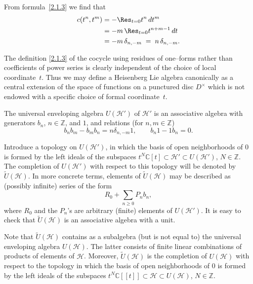 \documentclass[12pt]{article}
\begin{document}
From formula~\eqref{2.1.3} we find that
\[
    \begin{aligned}
        c(t^n, t^m)
         & = -\Res_{t=0} t^n\,dt^m        \\
         & = -m\,\Res_{t=0} t^{n+m-1}\,dt \\
         & = -m\,\delta_{n,-m}
        \;=\; n\,\delta_{n,-m}.
    \end{aligned}
\]

The definition \eqref{2.1.3} of the cocycle using residues of one–forms rather than coefficients of power series is clearly independent of the choice of local coordinate~$t$.
Thus we may define a Heisenberg Lie algebra canonically as a central extension of the space of functions on a punctured disc $D^\times$ which is not endowed with a specific choice of formal coordinate~$t$.


The universal enveloping algebra $U(\mathcal{H}')$ of $\mathcal{H}'$ is an associative algebra with generators $b_n$, $n\in\mathbb{Z}$, and $1$, and relations (for $n,m\in\mathbb{Z}$)
\[
    b_n b_m - b_m b_n = n \delta_{n,-m} 1,
    \qquad
    b_n 1 - 1 b_n = 0.
\]

Introduce a topology on $U(\mathcal{H}')$, in which the basis of open neighborhoods of $0$ is formed by the left ideals of the subspaces
$t^N\mathbb{C}[t] \subset \mathcal{H}' \subset U(\mathcal{H}')$, $N\in\mathbb{Z}$.
The completion of $U(\mathcal{H}')$ with respect to this topology will be denoted by $\widetilde{U}(\mathcal{H})$.
In more concrete terms, elements of $\widetilde{U}(\mathcal{H})$ may be described as (possibly infinite) series of the form
\[
    R_0 + \sum_{n\ge 0} P_n b_n,
\]
where $R_0$ and the $P_n$’s are arbitrary (finite) elements of $U(\mathcal{H}')$.
It is easy to check that $\widetilde{U}(\mathcal{H})$ is an associative algebra with a unit.

Note that $\widetilde{U}(\mathcal{H})$ contains as a subalgebra (but is not equal to) the universal enveloping algebra $U(\mathcal{H})$.
The latter consists of finite linear combinations of products of elements of $\mathcal{H}$.
Moreover, $\widetilde{U}(\mathcal{H})$ is the completion of $U(\mathcal{H})$ with respect to the topology in which the basis of open neighborhoods of $0$ is formed by the left ideals of the subspaces
$t^N\mathbb{C}[[t]] \subset \mathcal{H} \subset U(\mathcal{H})$, $N\in\mathbb{Z}$.
\end{document}
